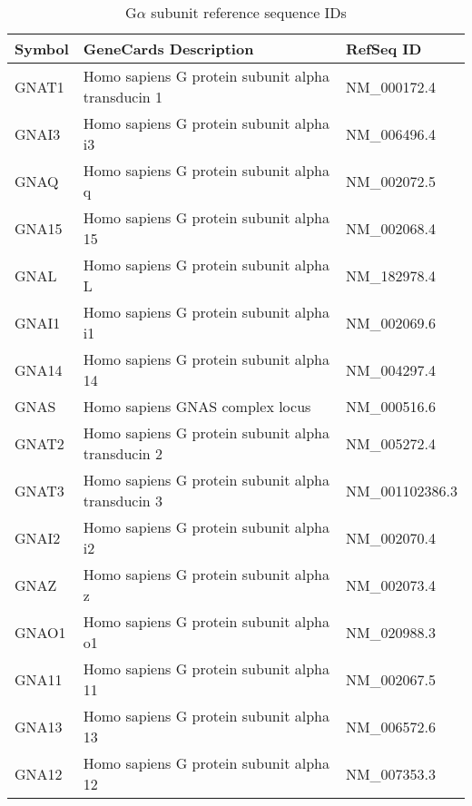 \begin{table}[t]

\caption{\label{tab:unnamed-chunk-2}G$\alpha$ subunit reference sequence IDs}
\centering
\begin{tabular}{lll}
\toprule
Symbol & GeneCards Description & RefSeq ID\\
\midrule
GNAT1 & Homo sapiens G protein subunit alpha transducin 1 & NM\_000172.4\\
GNAI3 & Homo sapiens G protein subunit alpha i3 & NM\_006496.4\\
GNAQ & Homo sapiens G protein subunit alpha q & NM\_002072.5\\
GNA15 & Homo sapiens G protein subunit alpha 15 & NM\_002068.4\\
GNAL & Homo sapiens G protein subunit alpha L & NM\_182978.4\\
\addlinespace
GNAI1 & Homo sapiens G protein subunit alpha i1 & NM\_002069.6\\
GNA14 & Homo sapiens G protein subunit alpha 14 & NM\_004297.4\\
GNAS & Homo sapiens GNAS complex locus & NM\_000516.6\\
GNAT2 & Homo sapiens G protein subunit alpha transducin 2 & NM\_005272.4\\
GNAT3 & Homo sapiens G protein subunit alpha transducin 3 & NM\_001102386.3\\
\addlinespace
GNAI2 & Homo sapiens G protein subunit alpha i2 & NM\_002070.4\\
GNAZ & Homo sapiens G protein subunit alpha z & NM\_002073.4\\
GNAO1 & Homo sapiens G protein subunit alpha o1 & NM\_020988.3\\
GNA11 & Homo sapiens G protein subunit alpha 11 & NM\_002067.5\\
GNA13 & Homo sapiens G protein subunit alpha 13 & NM\_006572.6\\
\addlinespace
GNA12 & Homo sapiens G protein subunit alpha 12 & NM\_007353.3\\
\bottomrule
\end{tabular}
\end{table}
